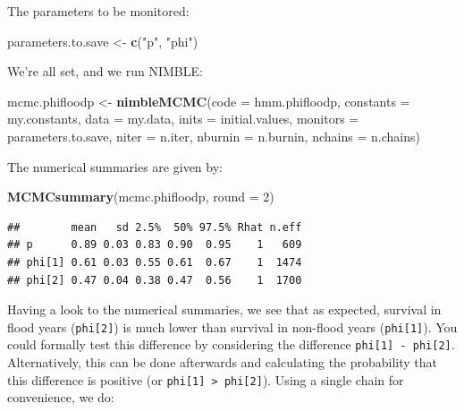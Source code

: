 \documentclass[
  12pt,
]{krantz}
\newenvironment{Shaded}{\begin{snugshade}}{\end{snugshade}}
\newcommand{\AttributeTok}[1]{\textcolor[rgb]{0.13,0.29,0.53}{#1}}
\newcommand{\DecValTok}[1]{\textcolor[rgb]{0.00,0.00,0.81}{#1}}
\newcommand{\FunctionTok}[1]{\textcolor[rgb]{0.13,0.29,0.53}{\textbf{#1}}}
\newcommand{\NormalTok}[1]{#1}
\newcommand{\OtherTok}[1]{\textcolor[rgb]{0.56,0.35,0.01}{#1}}
\newcommand{\StringTok}[1]{\textcolor[rgb]{0.31,0.60,0.02}{#1}}
\begin{document}
The parameters to be monitored:

\begin{Shaded}
\begin{Highlighting}[]
\NormalTok{parameters.to.save }\OtherTok{\textless{}{-}} \FunctionTok{c}\NormalTok{(}\StringTok{"p"}\NormalTok{, }\StringTok{"phi"}\NormalTok{)}
\end{Highlighting}
\end{Shaded}

We're all set, and we run NIMBLE:

\begin{Shaded}
\begin{Highlighting}[]
\NormalTok{mcmc.phifloodp }\OtherTok{\textless{}{-}} \FunctionTok{nimbleMCMC}\NormalTok{(}\AttributeTok{code =}\NormalTok{ hmm.phifloodp, }
                             \AttributeTok{constants =}\NormalTok{ my.constants,}
                             \AttributeTok{data =}\NormalTok{ my.data,              }
                             \AttributeTok{inits =}\NormalTok{ initial.values,}
                             \AttributeTok{monitors =}\NormalTok{ parameters.to.save,}
                             \AttributeTok{niter =}\NormalTok{ n.iter,}
                             \AttributeTok{nburnin =}\NormalTok{ n.burnin, }
                             \AttributeTok{nchains =}\NormalTok{ n.chains)}
\end{Highlighting}
\end{Shaded}

The numerical summaries are given by:

\begin{Shaded}
\begin{Highlighting}[]
\FunctionTok{MCMCsummary}\NormalTok{(mcmc.phifloodp, }\AttributeTok{round =} \DecValTok{2}\NormalTok{)}
\end{Highlighting}
\end{Shaded}

\begin{verbatim}
##        mean   sd 2.5%  50% 97.5% Rhat n.eff
## p      0.89 0.03 0.83 0.90  0.95    1   609
## phi[1] 0.61 0.03 0.55 0.61  0.67    1  1474
## phi[2] 0.47 0.04 0.38 0.47  0.56    1  1700
\end{verbatim}

Having a look to the numerical summaries, we see that as expected, survival in flood years (\texttt{phi{[}2{]}}) is much lower than survival in non-flood years (\texttt{phi{[}1{]}}). You could formally test this difference by considering the difference \texttt{phi{[}1{]}\ -\ phi{[}2{]}}. Alternatively, this can be done afterwards and calculating the probability that this difference is positive (or \texttt{phi{[}1{]}\ \textgreater{}\ phi{[}2{]}}). Using a single chain for convenience, we do:
\end{document}
